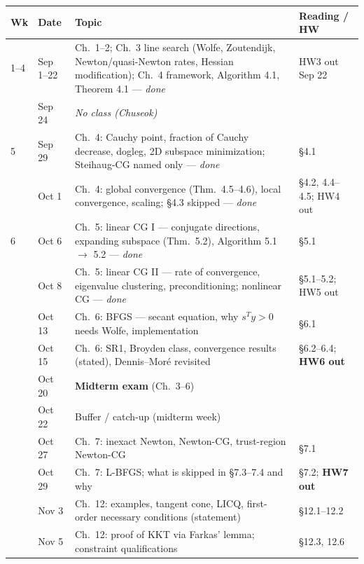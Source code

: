 \documentclass[10pt,a4paper]{article}
\newcommand{\done}[1]{\textcolor{black!45}{#1}}
\newcommand{\hw}[1]{\textbf{#1}}
\begin{document}
\renewcommand{\arraystretch}{1.15}
\begin{longtable}{@{}>{\raggedright\arraybackslash}p{7mm}>{\raggedright\arraybackslash}p{18mm}>{\raggedright\arraybackslash}p{86mm}>{\raggedright\arraybackslash}p{47mm}@{}}
\toprule
\textbf{Wk} & \textbf{Date} & \textbf{Topic} & \textbf{Reading / HW}\\
\midrule
\endhead
\done{1--4} & \done{Sep 1--22} & \done{Ch.~1--2; Ch.~3 line search (Wolfe, Zoutendijk, Newton/quasi-Newton rates,
  Hessian modification); Ch.~4 framework, Algorithm 4.1, Theorem 4.1 --- \emph{done}} & \done{HW3 out Sep 22}\\
4 & Sep 24 & \emph{No class (Chuseok)} & \\
\midrule
\done{5} & \done{Sep 29} & \done{Ch.~4: Cauchy point, fraction of Cauchy decrease, dogleg, 2D subspace
  minimization; Steihaug-CG named only --- \emph{done}} & \done{\S4.1}\\
 & \done{Oct 1} & \done{Ch.~4: global convergence (Thm.~4.5--4.6), local convergence, scaling; \S4.3 skipped
  --- \emph{done}} & \done{\S4.2, 4.4--4.5; HW4 out}\\
\done{6} & \done{Oct 6} & \done{Ch.~5: linear CG I --- conjugate directions, expanding subspace (Thm.~5.2),
  Algorithm 5.1 $\to$ 5.2 --- \emph{done}} & \done{\S5.1}\\
 & \done{Oct 8} & \done{Ch.~5: linear CG II --- rate of convergence, eigenvalue clustering, preconditioning;
  nonlinear CG --- \emph{done}} & \done{\S5.1--5.2; HW5 out}\\
7 & Oct 13 & Ch.~6: BFGS --- secant equation, why $s^{T}y>0$ needs Wolfe, implementation & \S6.1\\
 & Oct 15 & Ch.~6: SR1, Broyden class, convergence results (stated), Dennis--Mor\'e revisited
  & \S6.2--6.4; \hw{HW6 out}\\
\midrule
8 & Oct 20 & \textbf{Midterm exam} (Ch.~3--6) & \\
 & Oct 22 & Buffer / catch-up (midterm week) & \\
\midrule
9 & Oct 27 & Ch.~7: inexact Newton, Newton-CG, trust-region Newton-CG & \S7.1\\
 & Oct 29 & Ch.~7: L-BFGS; what is skipped in \S7.3--7.4 and why & \S7.2; \hw{HW7 out}\\
10 & Nov 3 & Ch.~12: examples, tangent cone, LICQ, first-order necessary conditions (statement)
  & \S12.1--12.2\\
 & Nov 5 & Ch.~12: proof of KKT via Farkas' lemma; constraint qualifications & \S12.3, 12.6\\

\end{longtable}
\end{document}
